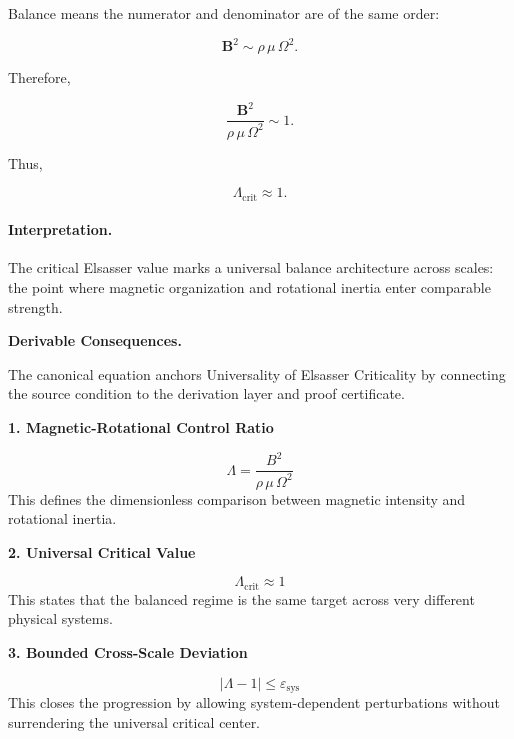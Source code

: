 Balance means the numerator and denominator are of the same order:

\begin{equation}
\mathbf{B}^2
\sim
\rho\,\mu\,\Omega^2 .
\end{equation}

Therefore,

\begin{equation}
\frac{\mathbf{B}^2}
{\rho\,\mu\,\Omega^2}
\sim
1 .
\end{equation}

Thus,

\begin{equation}
\boxed{
\Lambda_{\mathrm{crit}}\approx 1 .
}
\end{equation}

\paragraph{Interpretation.}
The critical Elsasser value marks a universal balance architecture across scales: the point where magnetic organization and rotational inertia enter comparable strength.

\par\vspace{0.35em}
\noindent\textbf{Derivable Consequences.}\quad
\begingroup
\footnotesize
\raggedright
The canonical equation anchors Universality of Elsasser Criticality by connecting the source condition to the derivation layer and proof certificate.
\par\endgroup

\noindent\textbf{1. Magnetic-Rotational Control Ratio}\par
\[
\Lambda
=
\frac{B^{2}}{\rho\,\mu\,\Omega^{2}}
\]
\noindent This defines the dimensionless comparison between magnetic intensity and rotational inertia.\par
\noindent\textbf{2. Universal Critical Value}\par
\[
\Lambda_{\mathrm{crit}} \approx 1
\]
\noindent This states that the balanced regime is the same target across very different physical systems.\par
\noindent\textbf{3. Bounded Cross-Scale Deviation}\par
\[
\left|\Lambda - 1\right| \leq \varepsilon_{\mathrm{sys}}
\]
\noindent This closes the progression by allowing system-dependent perturbations without surrendering the universal critical center.\par

